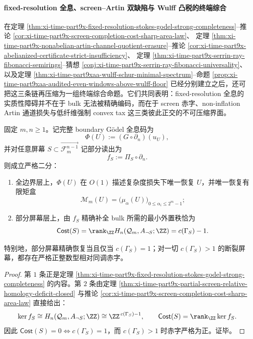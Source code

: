 \paragraph{fixed-resolution 全息、screen--Artin 双缺陷与 Wulff 凸税的终端综合}
在定理 \ref{thm:xi-time-part9x-fixed-resolution-stokes-godel-strong-completeness}--推论
\ref{cor:xi-time-part9x-screen-completion-cost-sharp-area-law}、
定理 \ref{thm:xi-time-part9x-nonabelian-artin-channel-quotient-erasure}--推论
\ref{cor:xi-time-part9x-abelianized-certificate-strict-insufficiency}、
定理 \ref{thm:xi-time-part9x-serrin-ray-fibonacci-semirings}--猜想
\ref{conj:xi-time-part9x-serrin-ray-fibonacci-universality}、
以及定理 \ref{thm:xi-time-part9xaa-wulff-schur-minimal-spectrum}--命题
\ref{prop:xi-time-part9xaa-audited-even-windows-above-wulff-floor} 已经分别建立之后，还可把这三条链再压缩为一组终端综合命题。它们共同表明：fixed-resolution 全息的实质性障碍并不在于 bulk 无法被精确编码，而在于 screen 赤字、non-inflation Artin 通道损失与低纤维强制 convex tax 这三类彼此正交的不可压缩界面。

\begin{theorem}[全边界完备与部分屏幕赤字的严格二分]\label{thm:xi-time-part9xaad-fullboundary-partialscreen-sharp-dichotomy}
固定 \(m,n\ge 1\)。记完整 boundary Gödel 全息码为
\[
\Phi(U):=(G\circ\partial_n)(u_U),
\]
并对任意屏幕 \(S\subset \overrightarrow{\mathcal F_m^{n-1}}\) 记部分读出为
\[
f_S:=\Pi_S\circ\partial_n.
\]
则成立严格二分：
\begin{enumerate}
  \item 全边界层上，\(\Phi(U)\) 在 \(O(1)\) 描述复杂度损失下唯一恢复 \(U\)，并唯一恢复有限矩盒
  \[
  \mathcal M_m(U)=\bigl(\mu_\alpha(U)\bigr)_{0\le \alpha_i\le 2^m-1};
  \]
  \item 部分屏幕层上，由 \(f_S\) 精确补全 bulk 所需的最小外置秩恰为
  \[
  \mathsf{Cost}(S)=\rank_\ZZ H_n(\mathcal Q_m,A_{\neg S};\ZZ)=c(\Gamma_S)-1.
  \]
\end{enumerate}
特别地，部分屏幕精确恢复当且仅当 \(c(\Gamma_S)=1\)；对一切 \(c(\Gamma_S)>1\) 的断裂屏幕，都存在严格正整数型相对同调赤字。
\end{theorem}
\begin{proof}
第 \(1\) 条正是定理 \ref{thm:xi-time-part9x-fixed-resolution-stokes-godel-strong-completeness} 的内容。第 \(2\) 条由定理 \ref{thm:xi-time-part9x-partial-screen-relative-homology-deficit-closed} 与推论 \ref{cor:xi-time-part9x-screen-completion-cost-sharp-area-law} 直接给出：
\[
\ker f_S\cong H_n(\mathcal Q_m,A_{\neg S};\ZZ)\cong \ZZ^{\,c(\Gamma_S)-1},
\qquad
\mathsf{Cost}(S)=\rank_\ZZ\ker f_S.
\]
因此 \(\mathsf{Cost}(S)=0\iff c(\Gamma_S)=1\)，而 \(c(\Gamma_S)>1\) 时赤字严格为正。证毕。
\end{proof}

